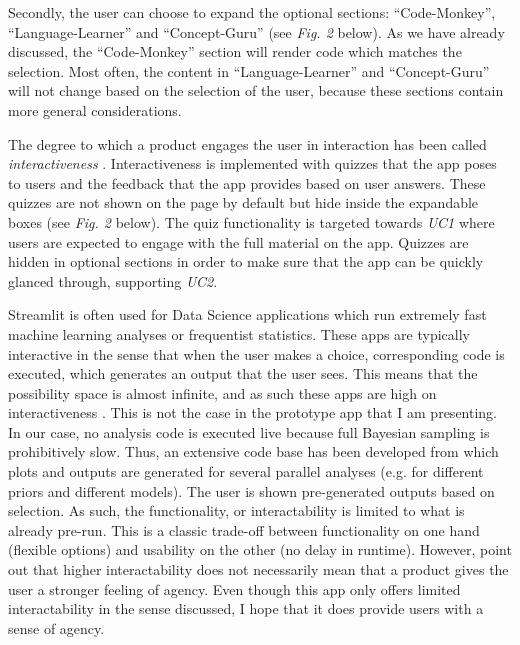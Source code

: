 \documentclass[12pt]{article}
\begin{document}
Secondly, the user can choose to expand the optional sections:
“Code-Monkey”, “Language-Learner” and “Concept-Guru” (see \emph{Fig. 2} below).
As we have already discussed, the “Code-Monkey” section will render code which matches the selection.
Most often, the content in “Language-Learner” and “Concept-Guru” will not
change
based on the selection of the user, because these sections contain more general considerations.

\vspace{5mm}

The degree to which a
product engages the user in interaction has been called \emph{interactiveness}
\autocite{janlert2017meaning}. Interactiveness is implemented with quizzes that the app
poses to users and the feedback that the app provides based on user answers.
These quizzes are not shown on the page by default but hide inside the
expandable boxes (see \emph{Fig. 2} below). The quiz functionality is targeted
towards \emph{UC1} where users are expected to engage with the full material on
the app. Quizzes are hidden in optional sections in order to make sure that the app can
be quickly glanced through, supporting \emph{UC2}.

\vspace{5mm}

Streamlit is often used for Data Science applications which run extremely
fast machine learning analyses or frequentist statistics. These apps are typically
interactive in the sense that when the user makes a choice, corresponding code
is executed,
which generates an output that the user sees. This means that the possibility space is almost
infinite, and as such these apps are high on interactiveness
\autocite{janlert2017meaning}. This is not the case in the prototype app that
I am presenting. In our case, no analysis code is executed live because full
Bayesian sampling is prohibitively slow. Thus, an extensive code base has been
developed from which plots and outputs are generated for several parallel analyses
(e.g. for different priors and different models). The user is shown
pre-generated outputs based on
selection. As such, the functionality, or interactability is limited to what is
already pre-run. This is a classic trade-off between functionality on one
hand (flexible options) and usability on the other (no delay in runtime).
However, \textcite{janlert2017meaning} point out that higher interactability
does not necessarily mean that a product gives the user a stronger feeling of
agency. Even though this
app only offers limited interactability in the sense discussed,
I hope that it does provide users with a
sense of agency.
\end{document}
